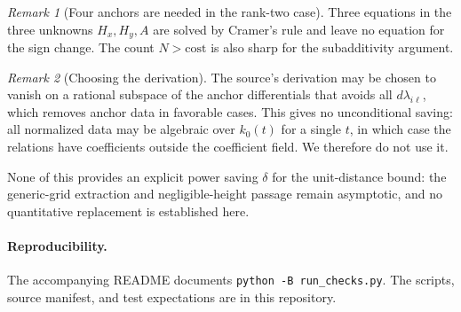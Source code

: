 \documentclass[11pt]{article}
\theoremstyle{remark}
\newtheorem{remark}{Remark}
\begin{document}
\begin{remark}[Four anchors are needed in the rank-two case]
Three equations in the three unknowns $H_x,H_y,A$ are solved by
Cramer's rule and leave no equation for the sign change. The count
$N>\text{cost}$ is also sharp for the subadditivity argument.
\end{remark}

\begin{remark}[Choosing the derivation]
The source's derivation may be chosen to vanish on a rational subspace
of the anchor differentials that avoids all $d\lambda_{i\ell}$, which
removes anchor data in favorable cases. This gives no unconditional
saving: all normalized data may be algebraic over $k_0(t)$ for a
single $t$, in which case the relations have coefficients outside the
coefficient field. We therefore do not use it.
\end{remark}

None of this provides an explicit power saving $\delta$ for the
unit-distance bound: the generic-grid extraction and negligible-height
passage remain asymptotic, and no quantitative replacement is
established here.

\paragraph{Reproducibility.}
The accompanying README documents \texttt{python -B run\_checks.py}.
The scripts, source manifest, and test expectations are in this repository.
\end{document}
